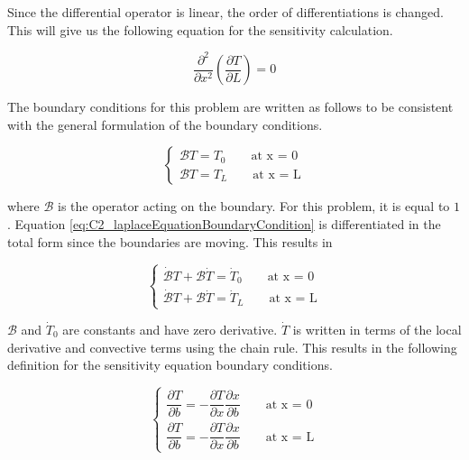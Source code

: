 Since the differential operator is linear, the order of differentiations is changed. This will give us the following equation for the sensitivity calculation.

\begin{equation}\label{eq:C2_laplaceSAequation}
	\frac{\partial^2}{\partial x^2} \left( \frac{\partial T}{\partial L} \right) = 0
\end{equation}

The boundary conditions for this problem are written as follows to be consistent with the general formulation of the boundary conditions. 

\begin{equation}\label{eq:C2_laplaceEquationBoundaryCondition}
\begin{cases}
	\mathcal{B}T = T_0 \qquad \text{at x = 0} \\
	\mathcal{B}T = T_L \qquad \text{at x = L}
\end{cases}
\end{equation}

where $\mathcal{B}$ is the operator acting on the boundary. For this problem, it is equal to $1$. Equation \eqref{eq:C2_laplaceEquationBoundaryCondition} is differentiated in the total form since the boundaries are moving. This results in

\begin{equation}
\begin{cases}
	\dot{\mathcal{B}} T + \mathcal{B} \dot{T} = \dot{T}_0 \qquad \text{at x = 0} \\
	\dot{\mathcal{B}} T + \mathcal{B} \dot{T} = \dot{T}_L \qquad \text{at x = L}
\end{cases}
\end{equation}

$\mathcal{B}$ and $\dot{T}_0$ are constants and have zero derivative. $\dot{T}$ is written in terms of the local derivative and convective terms using the chain rule. This results in the following definition for the sensitivity equation boundary conditions.

\begin{equation*}
\begin{cases}
	\dfrac{\partial T}{\partial b} = -\dfrac{\partial T}{\partial x} \dfrac{\partial x}{\partial b} \qquad \text{at x = 0}
	\\
	\dfrac{\partial T}{\partial b} = -\dfrac{\partial T}{\partial x} \dfrac{\partial x}{\partial b} \qquad \text{at x = L}
\end{cases}
\end{equation*}

